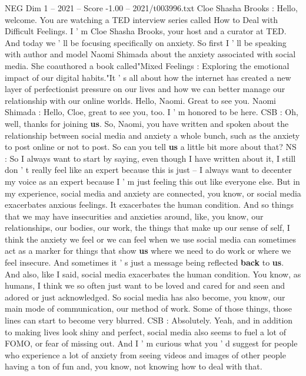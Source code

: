 \begin{textsample}{NEG Dim 1 – 2021 – Score -1.00 – 2021/t003996.txt}  \label{ex:f1_neg_019}
Cloe Shasha Brooks : Hello, welcome.
You are watching a TED interview series called How to Deal with Difficult Feelings.
I ' m Cloe Shasha Brooks, your host and a curator at TED.
And today we ' ll be focusing specifically on anxiety.
So first I ' ll be speaking with author and model Naomi Shimada about the anxiety associated with social media.
She coauthored a book called"Mixed Feelings : Exploring the emotional impact of our digital habits."It ' s all about how the internet has created a new layer of perfectionist pressure on our lives and how we can better manage our relationship with our online worlds.
Hello, Naomi.
Great to see you.
Naomi Shimada : Hello, Cloe, great to see you, too.
I ' m honored to be here.
CSB : Oh, well, thanks for joining \textbf{us}.
So, Naomi, you have written and spoken about the relationship between social media and anxiety a whole bunch, such as the anxiety to post online or not to post.
So can you tell \textbf{us} a little bit more about that?
NS : So I always want to start by saying, even though I have written about it, I still don ' t really feel like an expert because this is just -- I always want to decenter my voice as an expert because I ' m just feeling this out like everyone else.
But in my experience, social media and anxiety are connected, you know, or social media exacerbates anxious feelings.
It exacerbates the human condition.
And so things that we may have insecurities and anxieties around, like, you know, our relationships, our bodies, our work, the things that make up our sense of self, I think the anxiety we feel or we can feel when we use social media can sometimes act as a marker for things that show \textbf{us} where we need to do work or where we feel insecure.
And sometimes it ' s just a message being reflected \textbf{back} to \textbf{us}.
And also, like I said, social media exacerbates the human condition.
You know, as humans, I think we so often just want to be loved and cared for and seen and adored or just acknowledged.
So social media has also become, you know, our main mode of communication, our method of work.
Some of those things, those lines can start to become very blurred.
CSB : Absolutely.
Yeah, and in addition to making lives look shiny and perfect, social media also seems to fuel a lot of FOMO, or fear of missing out.
And I ' m curious what you ' d suggest for people who experience a lot of anxiety from seeing videos and images of other people having a ton of fun and, you know, not knowing how to deal with that.

\end{textsample}
